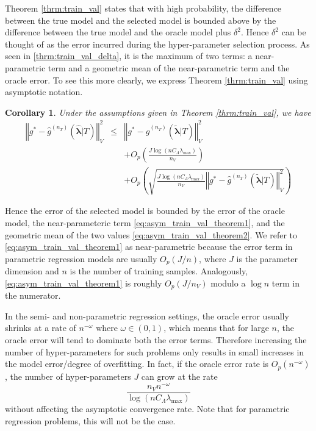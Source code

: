 \documentclass[12pt]{article}
\newtheorem{corollary}{Corollary}
\begin{document}
Theorem \ref{thrm:train_val} states that with high probability, the difference between the true model and the selected model is bounded above by the difference between the true model and the oracle model plus $\delta^2$. Hence $\delta^2$ can be thought of as the error incurred during the hyper-parameter selection process. As seen in \eqref{thrm:train_val_delta}, it is the maximum of two terms: a near-parametric term and a geometric mean of the near-parametric term and the oracle error. To see this more clearly, we express Theorem \ref{thrm:train_val} using asymptotic notation.
\begin{corollary}
	\label{corr:train_val}
	Under the assumptions given in Theorem \ref{thrm:train_val}, we have
	\begin{eqnarray}
	\left\Vert g^* - \hat{g}^{(n_T)}( \hat{\boldsymbol{\lambda}} | T) \right\Vert _{V}^2 &\le& \left\Vert g^* - \hat{g}^{(n_T)}( \tilde{\boldsymbol{\lambda}} | T) \right \Vert^2_{V}\\
	&& + O_p \left(\frac{J\log (n C_\Lambda\lambda_{\max})}{n_{V}} \right) 
	\label{eq:asym_train_val_theorem1} \\
	&& + O_p \left(
	\sqrt{
		\frac{J \log (n C_\Lambda\lambda_{\max})}{n_{V}}
		\left\Vert g^* - \hat{g}^{(n_T)}( \tilde{\boldsymbol{\lambda}}| T) \right \Vert^2_{V}
	}
	\right )
	\label{eq:asym_train_val_theorem2}
	\end{eqnarray}
\end{corollary}
Hence the error of the selected model is bounded by the error of the oracle model, the near-parameteric term \eqref{eq:asym_train_val_theorem1}, and the geometric mean of the two values \eqref{eq:asym_train_val_theorem2}. We refer to \eqref{eq:asym_train_val_theorem1} as near-parametric because the error term in parametric regression models are usually $O_p(J/n)$, where $J$ is the parameter dimension and $n$ is the number of training samples. Analogously, \eqref{eq:asym_train_val_theorem1} is roughly $O_p(J/n_V)$ modulo a $\log n$ term in the numerator.

In the semi- and non-parametric regression settings, the oracle error usually shrinks at a rate of $n^{-\omega}$ where $\omega \in (0, 1)$, which means that for large $n$, the oracle error will tend to dominate both the error terms. Therefore increasing the number of hyper-parameters for such problems only results in small increases in the model error/degree of overfitting. In fact, if the oracle error rate is $O_p(n^{-\omega})$, the number of hyper-parameters $J$ can grow at the rate
\begin{equation}
\frac{n_{V} n^{-\omega}}{\log (n C_\Lambda\lambda_{\max})}
\end{equation}
without affecting the asymptotic convergence rate. Note that for parametric regression problems, this will not be the case.
\end{document}
